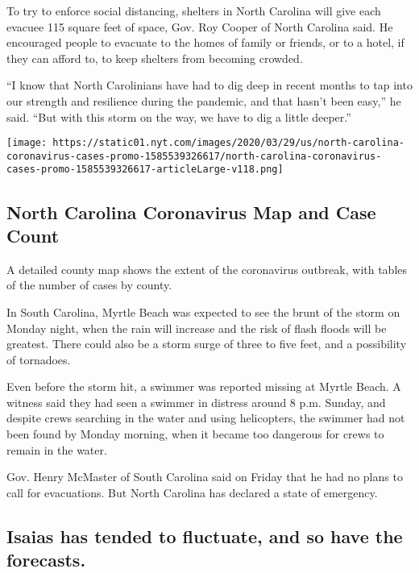 To try to enforce social distancing, shelters in North Carolina will
give each evacuee 115 square feet of space, Gov. Roy Cooper of North
Carolina said. He encouraged people to evacuate to the homes of family
or friends, or to a hotel, if they can afford to, to keep shelters from
becoming crowded.

``I know that North Carolinians have had to dig deep in recent months to
tap into our strength and resilience during the pandemic, and that
hasn't been easy,'' he said. ``But with this storm on the way, we have
to dig a little deeper.''

\href{https://www.nytimes.com/interactive/2020/us/north-carolina-coronavirus-cases.html}{}

\texttt{[image: https://static01.nyt.com/images/2020/03/29/us/north-carolina-coronavirus-cases-promo-1585539326617/north-carolina-coronavirus-cases-promo-1585539326617-articleLarge-v118.png]}

\hypertarget{north-carolina-coronavirus-map-and-case-count}{%
\subsection{North Carolina Coronavirus Map and Case
Count}\label{north-carolina-coronavirus-map-and-case-count}}

A detailed county map shows the extent of the coronavirus outbreak, with
tables of the number of cases by county.

In South Carolina, Myrtle Beach was expected to see the brunt of the
storm on Monday night, when the rain will increase and the risk of flash
floods will be greatest. There could also be a storm surge of three to
five feet, and a possibility of tornadoes.

Even before the storm hit, a swimmer was reported missing at Myrtle
Beach. A witness said they had seen a swimmer in distress around 8 p.m.
Sunday, and despite crews searching in the water and using helicopters,
the swimmer had not been found by Monday morning, when it became too
dangerous for crews to remain in the water.

Gov. Henry McMaster of South Carolina said on Friday that he had no
plans to call for evacuations. But North Carolina has declared a state
of emergency.

\hypertarget{isaias-has-tended-to-fluctuate-and-so-have-the-forecasts}{%
\subsection{Isaias has tended to fluctuate, and so have the
forecasts.}\label{isaias-has-tended-to-fluctuate-and-so-have-the-forecasts}}

